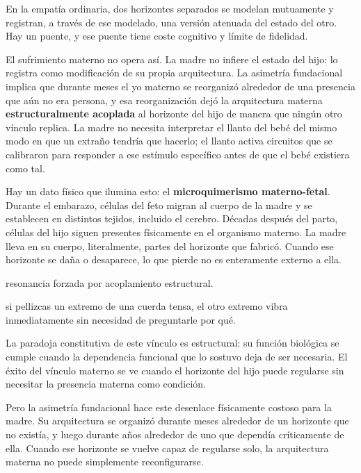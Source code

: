 En la empatía ordinaria, dos horizontes separados se modelan mutuamente y registran, a través de ese modelado, una versión atenuada del estado del otro. Hay un puente, y ese puente tiene coste cognitivo y límite de fidelidad.

El sufrimiento materno no opera así. La madre no infiere el estado del hijo: lo registra como modificación de su propia arquitectura. La asimetría fundacional implica que durante meses el yo materno se reorganizó alrededor de una presencia que aún no era persona, y esa reorganización dejó la arquitectura materna \textbf{estructuralmente acoplada} al horizonte del hijo de manera que ningún otro vínculo replica. La madre no necesita interpretar el llanto del bebé del mismo modo en que un extraño tendría que hacerlo; el llanto activa circuitos que se calibraron para responder a ese estímulo específico antes de que el bebé existiera como tal.

Hay un dato físico que ilumina esto: el \textbf{microquimerismo materno-fetal}. Durante el embarazo, células del feto migran al cuerpo de la madre y se establecen en distintos tejidos, incluido el cerebro. Décadas después del parto, células del hijo siguen presentes físicamente en el organismo materno. La madre lleva en su cuerpo, literalmente, partes del horizonte que fabricó. Cuando ese horizonte se daña o desaparece, lo que pierde no es enteramente externo a ella.

\begin{fisica}
 resonancia forzada por acoplamiento estructural.

 si pellizcas un extremo de una cuerda tensa, el otro extremo vibra inmediatamente sin necesidad de preguntarle por qué.
\end{fisica}
\noindent La paradoja constitutiva de este vínculo es estructural: su función biológica se cumple cuando la dependencia funcional que lo sostuvo deja de ser necesaria. El éxito del vínculo materno se ve cuando el horizonte del hijo puede regularse sin necesitar la presencia materna como condición.

Pero la asimetría fundacional hace este desenlace físicamente costoso para la madre. Su arquitectura se organizó durante meses alrededor de un horizonte que no existía, y luego durante años alrededor de uno que dependía críticamente de ella. Cuando ese horizonte se vuelve capaz de regularse solo, la arquitectura materna no puede simplemente reconfigurarse.

